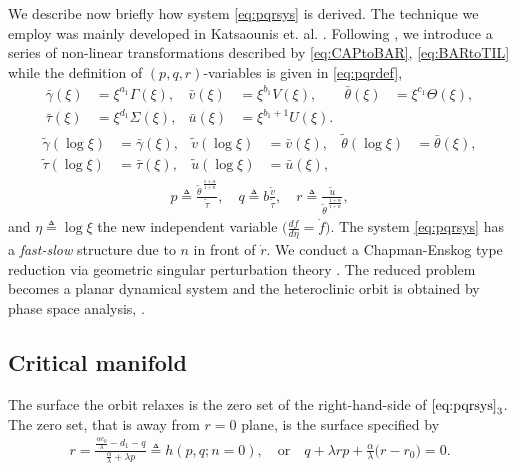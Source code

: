 \documentclass[graybox]{svmult}
\def\bg{{\bar{\gamma}}}
\def\bv{{\bar{v}}}
\def\bth{{\bar{\theta}}}
\def\bs{{\bar{\tau}}}
\def\bu{{\bar{u}}}
\def\tg{{\tilde{\gamma}}}
\def\tv{{\tilde{v}}}
\def\tth{{\tilde{\theta}}}
\def\ts{{\tilde{\tau}}}
\def\tu{{\tilde{u}}}
\begin{document}
We describe now briefly how system \eqref{eq:pqrsys} is derived.  The technique we employ was mainly developed in Katsaounis et. al. \cite{KOT14}. Following \cite{KOT14,LT16,LT16_2},  we introduce a series of non-linear transformations described by  \eqref{eq:CAPtoBAR}, \eqref{eq:BARtoTIL} while the definition of $(p,q,r)$-variables is given in \eqref{eq:pqrdef}, 
\begin{equation} \label{eq:CAPtoBAR}
\begin{aligned}
 \bg(\xi)&=\xi^{a_1}\Gamma(\xi), &
 \bv(\xi)&=\xi^{b_1}V(\xi), &
 \bth(\xi)&=\xi^{c_1}\Theta(\xi), \\
 \bs(\xi)&=\xi^{d_1}\Sigma(\xi), &
 \bu(\xi)&=\xi^{b_1+1}U(\xi).
\end{aligned}
\end{equation}
\begin{equation} \label{eq:BARtoTIL}
\begin{aligned}
 \tg(\log\xi)&=\bg(\xi), &
 \tv(\log\xi)&=\bv(\xi), &
 \tth(\log\xi)&=\bth(\xi), \\
 \ts(\log\xi)&=\bs(\xi), &
 \tu(\log\xi)&=\bu(\xi), 
\end{aligned}
\end{equation}
\begin{equation}\label{eq:pqrdef}
 \begin{aligned}
  p \triangleq \frac{\tth^{\,\frac{1+\alpha}{1+n}}}{\ts}, \quad q \triangleq b \frac{\tv}{\ts},  \quad r \triangleq \frac{\tu}{\tth^{\,\frac{1+\alpha}{1+n}}},
 \end{aligned}
\end{equation}
and $\eta\triangleq \log\xi$ the new independent variable $\Big(\frac{df}{d\eta}=\dot{f}\Big)$. 
The system \eqref{eq:pqrsys} has a {\it fast-slow} structure due to $n$ in front of $\dot{r}$. We conduct a Chapman-Enskog type reduction via geometric singular perturbation theory \cite{fenichel_geometric_1979, KUEHN_2015}. The reduced problem becomes a planar dynamical system and  the heteroclinic orbit is obtained by phase space analysis, \cite{LT16_2}. 
\subsection{Critical manifold}
The surface the orbit relaxes is the zero set of the right-hand-side of $\eqref{eq:pqrsys}_3$. The zero set,  that is away from $r=0$ plane,  is the surface specified by
\begin{align*}
 r=\frac{ \frac{\alpha c_0}{\lambda} - d_1 -q }{ \frac{\alpha}{\lambda} + \lambda p}\triangleq h(p,q;n=0), \quad \text{or} \quad  q + \lambda {r}p + \frac{\alpha}{\lambda} \Big( r-r_0\Big)=0.
\end{align*}
\end{document}
